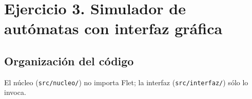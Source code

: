 \hypertarget{ejercicio-3.-simulador-de-autuxf3matas-con-interfaz-gruxe1fica}{%
\section{Ejercicio 3. Simulador de autómatas con interfaz gráfica}\label{ejercicio-3.-simulador-de-autuxf3matas-con-interfaz-gruxe1fica}}

\hypertarget{organizaciuxf3n-del-cuxf3digo}{%
\subsection{Organización del código}\label{organizaciuxf3n-del-cuxf3digo}}

El núcleo (\texttt{src/nucleo/}) no importa Flet; la interfaz (\texttt{src/interfaz/}) sólo lo invoca.


